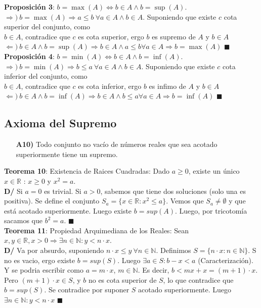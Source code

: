 \documentclass[11pt,a4paper]{article}
\newcommand*{\QEDA}{\null\nobreak\hfill\ensuremath{\blacksquare}}
\begin{document}
\noindent \textbf{Proposici\'on 3}: $b = \max(A) \iff b \in A \land b = \sup(A)$.\\
$\Rightarrow)\ b = \max(A) \Rightarrow a \leq b\ \forall a \in A \land b \in A$. Suponiendo que existe $c$ cota superior del conjunto, como\\ \indent $b \in A$, contradice que $c$ es cota superior, ergo $b$ es supremo de $A$ y $b \in A$\\
$\Leftarrow)\ b \in A \land b = \sup(A) \Rightarrow b \in A \land a\leq b \forall a \in A \Rightarrow b = \max(A)$ \QEDA\\

\noindent \textbf{Proposici\'on 4}: $b = \min(A) \iff b \in A \land b = \inf(A)$.\\
$\Rightarrow)\ b = \min(A) \Rightarrow b \leq a\ \forall a \in A \land b \in A$. Suponiendo que existe $c$ cota inferior del conjunto, como\\ \indent $b \in A$, contradice que $c$ es cota inferior, ergo $b$ es infimo de $A$ y $b \in A$\\
$\Leftarrow)\ b \in A \land b = \inf(A) \Rightarrow b \in A \land b\leq a \forall a \in A \Rightarrow b = \inf(A)$ \QEDA\\


\subsection{Axioma del Supremo}
\begin{itemize}
\item[\textbf{A10)}] Todo conjunto no vac\'io de n\'umeros reales que sea acotado superiormente tiene un supremo.\\
\end{itemize}

\noindent \textbf{Teorema 10}: Existencia de Raices Cuadradas: Dado $a \geq 0$, existe un \'unico $x \in \mathbb{R}$ : $x \geq 0$ y $x^2 = a$. \\
\textbf{D/} Si $a=0$ es trivial. Si $a > 0$, sabemos que tiene dos soluciones (solo una es positiva). Se define el conjunto $S_a = \{ x \in \mathbb{R} : x^2 \leq a \}$. Vemos que $S_a \not = \emptyset$ y que est\'a acotado superiormente. Luego existe $b = sup(A)$. Luego, por tricotom\'ia sacamos que $b^2 = a$. \QEDA \\

\noindent \textbf{Teorema 11}: Propiedad Arquimediana de los Reales: Sean $x,y \in \mathbb{R}, x > 0 \Rightarrow \exists n \in \mathbb{N} : y < n \cdot x$.\\ 
\textbf{D/} Va por absurdo, suponiendo $n\cdot x \leq y\ \forall n \in \mathbb{N}$. Definimos $S = \{ n\cdot x : n \in \mathbb{N} \}$. S no es vacio, ergo existe $b=sup(S)$. Luego $\exists a \in S : b - x < a$ (Caracterizaci\'on). Y se podria escribir como $a = m \cdot x$, $m \in \mathbb{N}$. Es decir, $b < mx + x = (m+1) \cdot x$. Pero $(m+1) \cdot x \in S$, y $b$ no es cota superior de $S$, lo que contradice que $b = sup(S)$. Se contradice por suponer $S$ acotado superiormente. Luego $\exists n \in \mathbb{N} : y < n\cdot x$ \QEDA \\
\end{document}
